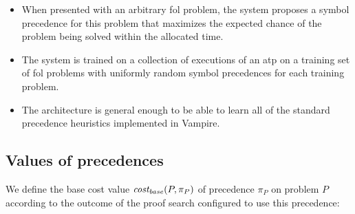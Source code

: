 \begin{itemize}
	\item When presented with an arbitrary \gls{fol} problem,
	the system proposes a symbol precedence for this problem
	that maximizes the expected chance of the problem being solved
	within the allocated time.
	
	\item The system is trained on a collection of executions of an \gls{atp}
	on a training set of \gls{fol} problems
	with uniformly random symbol precedences for each training problem.
	
	\item The architecture is general enough to be able to learn
	all of the standard precedence heuristics implemented in Vampire.\cite{?}
\end{itemize}


\subsection{Values of precedences}
\label{sec:precedence-valuation}


We define the base cost
value \(\operatorname{\mathit{cost_{base}}}(P, \pi_P)\) of precedence \(\pi_P\) on problem \(P\)
according to the outcome of the proof search configured to use this precedence:

